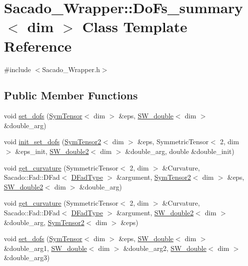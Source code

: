 \hypertarget{classSacado__Wrapper_1_1DoFs__summary}{}\section{Sacado\+\_\+\+Wrapper\+:\+:Do\+Fs\+\_\+summary$<$ dim $>$ Class Template Reference}
\label{classSacado__Wrapper_1_1DoFs__summary}


{\ttfamily \#include $<$Sacado\+\_\+\+Wrapper.\+h$>$}

\subsection*{Public Member Functions}
\begin{DoxyCompactItemize}
\item 
void \hyperlink{classSacado__Wrapper_1_1DoFs__summary_a556293f6e683cb30151d9faadc2cc90d}{set\+\_\+dofs} (\hyperlink{classSacado__Wrapper_1_1SymTensor}{Sym\+Tensor}$<$ dim $>$ \&eps, \hyperlink{classSacado__Wrapper_1_1SW__double}{S\+W\+\_\+double}$<$ dim $>$ \&double\+\_\+arg)
\item 
void \hyperlink{classSacado__Wrapper_1_1DoFs__summary_ae273d0fa3197118a11d7005523e27d8a}{init\+\_\+set\+\_\+dofs} (\hyperlink{classSacado__Wrapper_1_1SymTensor2}{Sym\+Tensor2}$<$ dim $>$ \&eps, Symmetric\+Tensor$<$ 2, dim $>$ \&eps\+\_\+init, \hyperlink{classSacado__Wrapper_1_1SW__double2}{S\+W\+\_\+double2}$<$ dim $>$ \&double\+\_\+arg, double \&double\+\_\+init)
\item 
void \hyperlink{classSacado__Wrapper_1_1DoFs__summary_adf29bfda10814ecee9572a4751d34db0}{get\+\_\+curvature} (Symmetric\+Tensor$<$ 2, dim $>$ \&Curvature, Sacado\+::\+Fad\+::\+D\+Fad$<$ \hyperlink{Sacado__Wrapper_8h_a7e0893207b87dad05c66a34baac8ed2e}{D\+Fad\+Type} $>$ \&argument, \hyperlink{classSacado__Wrapper_1_1SymTensor2}{Sym\+Tensor2}$<$ dim $>$ \&eps, \hyperlink{classSacado__Wrapper_1_1SW__double2}{S\+W\+\_\+double2}$<$ dim $>$ \&double\+\_\+arg)
\item 
void \hyperlink{classSacado__Wrapper_1_1DoFs__summary_abc10231129de5c52fd9aba22701aa5fa}{get\+\_\+curvature} (Symmetric\+Tensor$<$ 2, dim $>$ \&Curvature, Sacado\+::\+Fad\+::\+D\+Fad$<$ \hyperlink{Sacado__Wrapper_8h_a7e0893207b87dad05c66a34baac8ed2e}{D\+Fad\+Type} $>$ \&argument, \hyperlink{classSacado__Wrapper_1_1SW__double2}{S\+W\+\_\+double2}$<$ dim $>$ \&double\+\_\+arg, \hyperlink{classSacado__Wrapper_1_1SymTensor2}{Sym\+Tensor2}$<$ dim $>$ \&eps)
\item 
void \hyperlink{classSacado__Wrapper_1_1DoFs__summary_a875597639efab9d48f47ea5b91b56271}{set\+\_\+dofs} (\hyperlink{classSacado__Wrapper_1_1SymTensor}{Sym\+Tensor}$<$ dim $>$ \&eps, \hyperlink{classSacado__Wrapper_1_1SW__double}{S\+W\+\_\+double}$<$ dim $>$ \&double\+\_\+arg1, \hyperlink{classSacado__Wrapper_1_1SW__double}{S\+W\+\_\+double}$<$ dim $>$ \&double\+\_\+arg2, \hyperlink{classSacado__Wrapper_1_1SW__double}{S\+W\+\_\+double}$<$ dim $>$ \&double\+\_\+arg3)
\end{DoxyCompactItemize}


